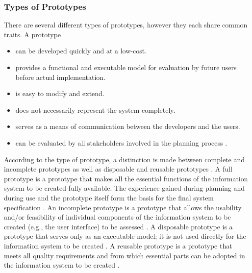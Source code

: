 \subsubsection*{Types of Prototypes}

There are several different types of prototypes,
however they each share common traits.
A prototype

\begin{itemize}
	\item can be developed quickly and at a low-cost.
	\item provides a functional and executable model for evaluation by future users before actual implementation.
	\item is easy to modify and extend.
	\item does not necessarily represent the system completely.
	\item serves as a means of communication between the developers and the users.
	\item can be evaluated by all stakeholders involved in the planning process \autocite{riedlManagementInformatik2019}.
\end{itemize}

According to the type of prototype, a distinction is made between complete and incomplete prototypes
as well as disposable and reusable prototypes
\autocite{riedlManagementInformatik2019}.
A full prototype is a prototype that makes all the essential functions of the information system to be created fully available.
The experience gained during planning and during use and the prototype itself form the basis for the final system specification
\autocite{riedlManagementInformatik2019}.
An incomplete prototype is a prototype that allows the usability and/or feasibility of individual components
of the information system to be created (e.g., the user interface) to be assessed
\autocite{riedlManagementInformatik2019}.
A disposable prototype is a prototype that serves only as an executable model;
it is not used directly for the information system to be created
\autocite{riedlManagementInformatik2019}.
A reusable prototype is a prototype that meets all quality requirements and from which
essential parts can be adopted in the information system to be created
\autocite{riedlManagementInformatik2019}.

%

\newpage


